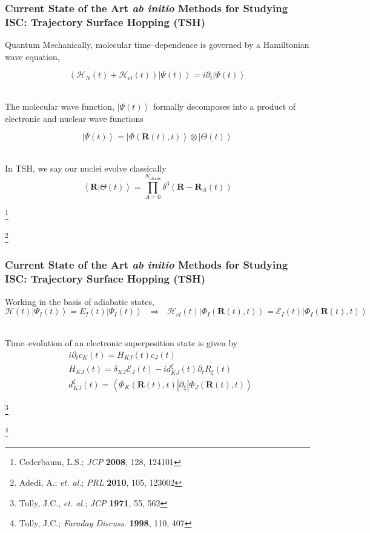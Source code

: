 \documentclass[usepdftitle=false,10pt]{beamer}
\newcommand{\bpar}[1]{\left( #1 \right)}                  %
\newcommand{\ket}[1]{\left\vert #1 \right\rangle}         %
\newcommand{\inner}[2]{\left\langle #1 \left\vert\right. #2 \right\rangle}            %
\newcommand{\innerop}[3]{\left\langle #1 \left\vert #2 \right\vert #3 \right\rangle}  %
\newcommand*\vc[1]{\boldsymbol{#1}}
\newcommand*\op[1]{\mathcal{#1}}
\newcommand\blfootnote[1]{%
  \begingroup
  \renewcommand\thefootnote{}\footnote{#1}%
  \addtocounter{footnote}{-1}%
  \endgroup
}
\begin{document}
\begin{frame}
  \frametitle{Current State of the Art \emph{ab initio} Methods for Studying 
  ISC: Trajectory Surface Hopping (TSH)}

  Quantum Mechanically, molecular time--dependence is governed by a Hamiltonian
  wave equation,

  \begin{equation*}
    \bpar{\op{H}_N(t) + \op{H}_{el}(t)} \ket{\Psi (t)} = i\partial_t \ket{\Psi(t)}
  \end{equation*}

  ~\\
  The molecular wave function, $\ket{\Psi(t)}$ formally decomposes into a product
  of electronic and nuclear wave functions

  \begin{equation*} 
    \ket{\Psi (t)} = \ket{\Phi(\vc{R}(t),t)}\otimes\ket{\Theta(t)} 
  \end{equation*} 

  ~\\
  In TSH, we say our nuclei evolve classically
  \begin{equation*}
    \inner{\vc{R}}{\Theta (t)} = \prod_{A = 0}^{N_\mathrm{atoms}} 
    \delta^3(\vc{R} - \vc{R}_A(t))
  \end{equation*}

  \vspace{-0.5cm}
  \blfootnote{\tiny Cederbaum, L.S.; \emph{JCP} \textbf{2008}, 128, 124101}
  \blfootnote{\tiny Adedi, A.; \emph{et. al.}; \emph{PRL} \textbf{2010}, 105, 123002}
\end{frame}

\begin{frame}
  \frametitle{Current State of the Art \emph{ab initio} Methods for Studying 
  ISC: Trajectory Surface Hopping (TSH)}

  Working in the basis of adiabatic states,
  \begin{equation*}
    \op{H}(t) \ket{\Psi_I (t)} = E_I(t) \ket{\Psi_I (t)}
    \text{ }\Longrightarrow \text{ }
    \op{H}_{el}(t)\ket{\Phi_I(\vc{R}(t),t)} = 
      \mathcal{E}_I(t)\ket{\Phi_I(\vc{R}(t),t)}
  \end{equation*}
  
  ~\\
  Time--evolution of an electronic superposition state is given by
  \begin{align*}
    &i  \partial_t c_K(t) = H_{KJ}(t) c_J(t) \\
    &H_{KJ}(t) = \delta_{KJ}\mathcal{E}_J(t) - i d_{KJ}^\xi (t) \partial_t R_{\xi}(t) \\
    &d_{KJ}^\xi (t) = \innerop{\Phi_K(\vc{R}(t),t)}{\partial_\xi}{\Phi_J(\vc{R}(t),t)}
  \end{align*}

  \blfootnote{\tiny Tully, J.C., \emph{et. al.}; \emph{JCP} \textbf{1971}, 55, 562}
  \blfootnote{\tiny Tully, J.C.; \emph{Faraday Discuss.} \textbf{1998}, 110, 407}
\end{frame}
\end{document}

